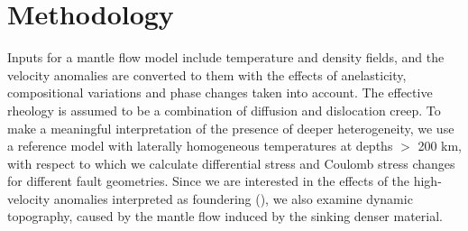 \documentclass[draft,linenumbers]{agujournal2018}
\begin{document}
\section{Methodology}
    Inputs for a mantle flow model include temperature and density fields, and the velocity anomalies are converted to them with the effects of anelasticity, compositional variations and phase changes taken into account. The effective rheology is assumed to be a combination of diffusion and dislocation creep. To make a meaningful interpretation of the presence of deeper heterogeneity, we use a reference model with laterally homogeneous temperatures at depths $>$ 200 km, with respect to which we calculate differential stress and Coulomb stress changes for different fault geometries. Since we are interested in the effects of the high-velocity anomalies interpreted as foundering (\citep{Biryol_2016}), we also examine dynamic topography, caused by the mantle flow induced by the sinking denser material. 
    
\end{document}
